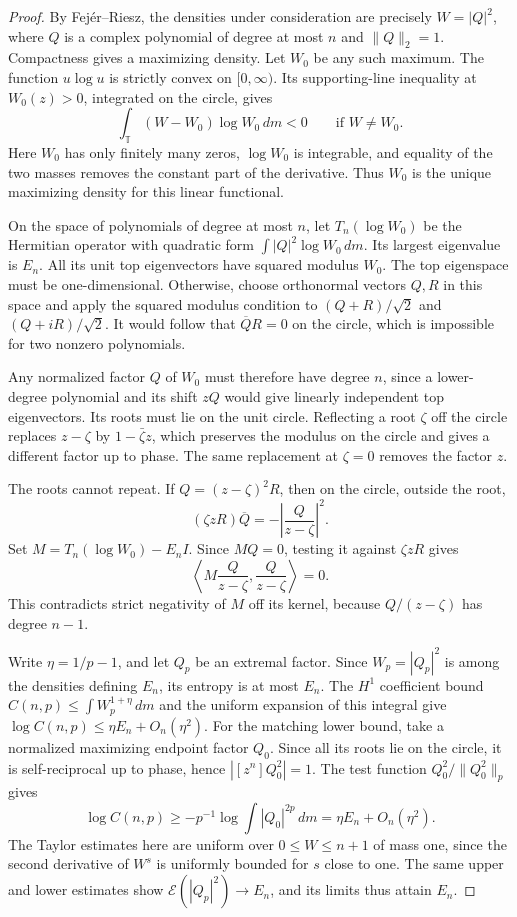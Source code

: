 \documentclass[11pt]{article}
\begin{document}
\begin{proof}
By Fej\'er--Riesz, the densities under consideration are precisely
\(W=|Q|^2\), where \(Q\) is a complex polynomial of degree at most
\(n\) and \(\|Q\|_2=1\). Compactness gives a maximizing density.
Let \(W_0\) be any such maximum. The function \(u\log u\) is
strictly convex on \([0,\infty)\). Its supporting-line inequality
at \(W_0(z)>0\), integrated on the circle, gives
\[
 \int_{\mathbb T}(W-W_0)\log W_0\,dm < 0
 \qquad\text{if }W\ne W_0.
\]
Here \(W_0\) has only finitely many zeros,
\(\log W_0\) is integrable, and equality of the two masses removes
the constant part of the derivative. Thus \(W_0\) is the unique
maximizing density for this linear functional.

On the space of polynomials of degree at most \(n\), let
\(T_n(\log W_0)\) be the Hermitian operator with quadratic form
\(\int |Q|^2 \log W_0\,dm\). Its largest eigenvalue is \(E_n\).
All its unit top eigenvectors have squared modulus \(W_0\).
The top eigenspace must be one-dimensional. Otherwise, choose
orthonormal vectors \(Q,R\) in this space and apply the squared
modulus condition to \((Q+R)/\sqrt 2\) and \((Q+iR)/\sqrt 2\).
It would follow that \(\overline Q R=0\) on the circle, which
is impossible for two nonzero polynomials.

Any normalized factor \(Q\) of \(W_0\) must therefore have degree
\(n\), since a lower-degree polynomial and its shift \(zQ\)
would give linearly independent top eigenvectors. Its roots must
lie on the unit circle. Reflecting a root \(\zeta\) off the circle
replaces \(z-\zeta\) by \(1-\bar\zeta z\), which preserves the
modulus on the circle and gives a different factor up to phase.
The same replacement at \(\zeta=0\) removes the factor \(z\).

The roots cannot repeat. If \(Q=(z-\zeta)^2R\), then on the
circle, outside the root,
\[
 (\zeta zR)\overline Q=-\left|\frac{Q}{z-\zeta}\right|^2 .
\]
Set \(M=T_n(\log W_0)-E_n I\). Since \(MQ=0\), testing it
against \(\zeta zR\) gives
\[
 \left\langle M\frac{Q}{z-\zeta},\frac{Q}{z-\zeta}\right\rangle=0 .
\]
This contradicts strict negativity of \(M\) off its kernel,
because \(Q/(z-\zeta)\) has degree \(n-1\).

Write \(\eta=1/p-1\), and let \(Q_p\) be an extremal factor.
Since \(W_p=|Q_p|^2\) is among the densities defining \(E_n\),
its entropy is at most \(E_n\). The \(H^1\) coefficient bound
\(C(n,p)\le\int W_p^{1+\eta}\,dm\) and the uniform expansion of
this integral give \(\log C(n,p)\le\eta E_n+O_n(\eta^2)\).
For the matching lower bound, take a normalized maximizing
endpoint factor \(Q_0\). Since all its roots lie on the circle,
it is self-reciprocal up to phase, hence
\(|[z^n]Q_0^2|=1\). The test function \(Q_0^2/\|Q_0^2\|_p\)
gives
\[
 \log C(n,p)\geq
 -p^{-1}\log\!\int |Q_0|^{2p}\,dm
 =\eta E_n+O_n(\eta^2).
\]
The Taylor estimates here are uniform over \(0\leq W\leq n+1\)
of mass one, since the second derivative of \(W^s\) is uniformly
bounded for \(s\) close to one. The same upper and lower estimates
show \(\mathcal E(|Q_p|^2)\to E_n\), and its limits thus attain
\(E_n\).


\end{proof}
\end{document}
